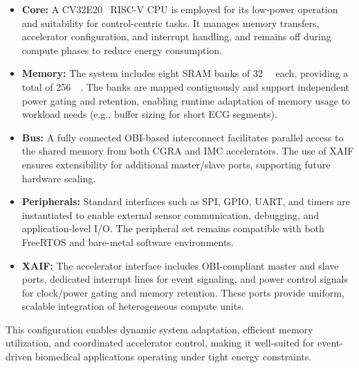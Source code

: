                 \vspace{-1em}
                \begin{itemize}
                    \item \textbf{Core:} A \textsc{CV32E20}~\cite{zeroriscy} RISC-V CPU is employed for its low-power operation and suitability for control-centric tasks. It manages memory transfers, accelerator configuration, and interrupt handling, and remains off during compute phases to reduce energy consumption.
                
                    \item \textbf{Memory:} The system includes eight SRAM banks of \SI{32}{\kibi\byte} each, providing a total of \SI{256}{\kibi\byte}. The banks are mapped contiguously and support independent power gating and retention, enabling runtime adaptation of memory usage to workload needs (e.g., buffer sizing for short ECG segments).
                
                    \item \textbf{Bus:} A fully connected OBI-based interconnect facilitates parallel access to the shared memory from both CGRA and IMC accelerators. The use of XAIF ensures extensibility for additional master/slave ports, supporting future hardware scaling.
                
                    \item \textbf{Peripherals:} Standard interfaces such as SPI, GPIO, UART, and timers are instantiated to enable external sensor communication, debugging, and application-level I/O. The peripheral set remains compatible with both FreeRTOS and bare-metal software environments.
                
                    \item \textbf{XAIF:} The accelerator interface includes OBI-compliant master and slave ports, dedicated interrupt lines for event signaling, and power control signals for \mbox{clock/power} gating and memory retention. These ports provide uniform, scalable integration of heterogeneous compute units.
                \end{itemize}
                \vspace{-1em}
                
                This configuration enables dynamic system adaptation, efficient memory utilization, and coordinated accelerator control, making it well-suited for event-driven biomedical applications operating under tight energy constraints.

